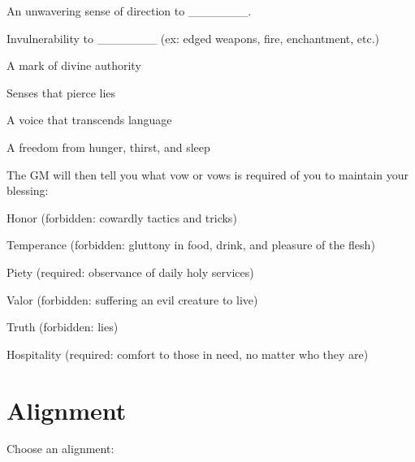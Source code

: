 \item An unwavering sense of direction to \_\_\_\_\_\_\_.

             
\item Invulnerability to \_\_\_\_\_\_\_ (ex: edged weapons, fire, enchantment, etc.)

             
\item A mark of divine authority

             
\item Senses that pierce lies

             
\item A voice that transcends language

             
\item A freedom from hunger, thirst, and sleep

           
\stopitemize
           

The GM will then tell you what vow or vows is required of you to maintain your blessing:

           
\startitemize[1,packed]
             
\item Honor (forbidden: cowardly tactics and tricks)

             
\item Temperance (forbidden: gluttony in food, drink, and pleasure of the flesh)

             
\item Piety (required: observance of daily holy services)

             
\item Valor (forbidden: suffering an evil creature to live)

             
\item Truth (forbidden: lies)

             
\item Hospitality (required: comfort to those in need, no matter who they are)

           
\stopitemize
         

       

       
\section{Alignment}   
       
\startInstructionsAfterHeader
Choose an alignment:
\stopInstructionsAfterHeader
       

